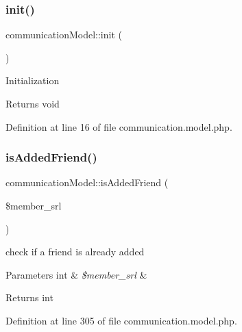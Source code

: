 \hypertarget{classcommunicationModel_adff18c028fa89afeb6d7898fde5e2f91}{}\label{classcommunicationModel_adff18c028fa89afeb6d7898fde5e2f91} 
\subsubsection{\texorpdfstring{init()}{init()}}
{\footnotesize\ttfamily communication\+Model\+::init (\begin{DoxyParamCaption}{ }\end{DoxyParamCaption})}

Initialization \begin{DoxyReturn}{Returns}
void 
\end{DoxyReturn}


Definition at line 16 of file communication.\+model.\+php.

\hypertarget{classcommunicationModel_a47441e7b20018de3fc6ab52bfb9b0d73}{}\label{classcommunicationModel_a47441e7b20018de3fc6ab52bfb9b0d73} 
\subsubsection{\texorpdfstring{is\+Added\+Friend()}{isAddedFriend()}}
{\footnotesize\ttfamily communication\+Model\+::is\+Added\+Friend (\begin{DoxyParamCaption}\item[{}]{\$member\+\_\+srl }\end{DoxyParamCaption})}

check if a friend is already added 
\begin{DoxyParams}[1]{Parameters}
int & {\em \$member\+\_\+srl} & \\
\hline
\end{DoxyParams}
\begin{DoxyReturn}{Returns}
int 
\end{DoxyReturn}


Definition at line 305 of file communication.\+model.\+php.

\hypertarget{classcommunicationModel_a4e291316d5021ded0725169ada2a5dda}{}\label{classcommunicationModel_a4e291316d5021ded0725169ada2a5dda} 
